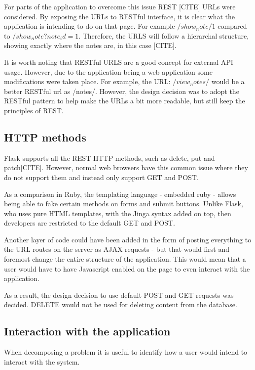 For parts of the application to overcome this issue REST [CITE] URLs were considered. By exposing the URLs to RESTful interface, it is clear what the application is intending to do on that page. For example $/show_note/1$ compared to $/show_note?note_id=1$. Therefore, the URLS will follow a hierarchal structure, showing exactly where the notes are, in this case [CITE].

It is worth noting that RESTful URLS are a good concept for external API usage. However, due to the application being a web application some modifications were taken place. For example, the URL: $/view_notes/$ would be a better RESTful url as /notes/. However, the design decision was to adopt the RESTful pattern to help make the URLs a bit more readable, but still keep the principles of REST.

\subsection{HTTP methods}
Flask supports all the REST HTTP methods, such as delete, put and patch[CITE]. However, normal web browsers have this common issue where they do not support them and instead only support GET and POST.

As a comparison in Ruby, the templating language - embedded ruby - allows being able to fake certain methods on forms and submit buttons. Unlike Flask, who uses pure HTML templates, with the Jinga syntax added on top, then developers are restricted to the default GET and POST.

Another layer of code could have been added in the form of posting everything to the URL routes on the server as AJAX requests - but that would first and foremost change the entire structure of the application. This would mean that a user would have to have Javascript enabled on the page to even interact with the application.

As a result, the design decision to use default POST and GET requests was decided. DELETE would not be used for deleting content from the database.

\subsection{Interaction with the application}
When decomposing a problem it is useful to identify how a user would intend to interact with the system.





